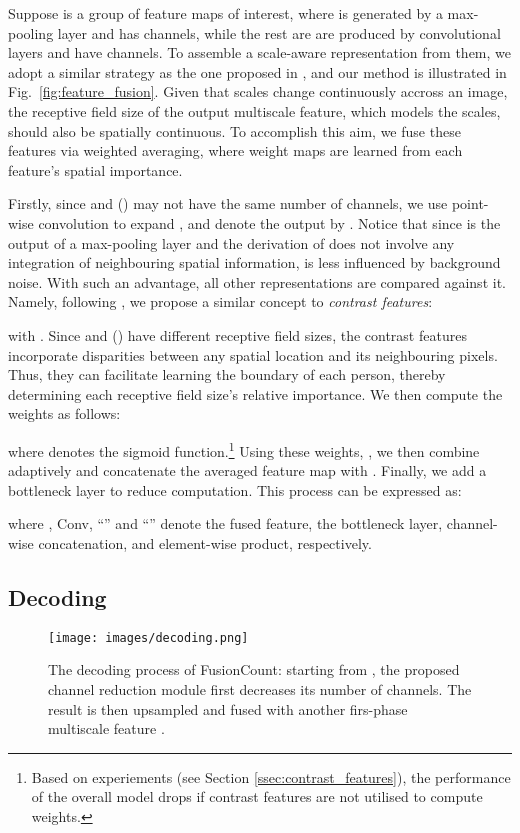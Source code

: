 \documentclass{article}
\begin{document}
Suppose  is a group of feature maps of interest, where  is generated by a max-pooling layer and has  channels, while the rest are are produced by convolutional layers and have  channels. To assemble a scale-aware representation from them, we adopt a similar strategy as the one proposed in \cite{CAN}, and our method is illustrated in Fig.~\ref{fig:feature_fusion}. Given that scales change continuously accross an image, the receptive field size of the output multiscale feature, which models the scales, should also be spatially continuous. To accomplish this aim, we fuse these features via weighted averaging, where weight maps are learned from each feature's spatial importance.

Firstly, since  and  () may not have the same number of channels, we use point-wise convolution to expand , and denote the output by . Notice that since  is the output of a max-pooling layer and the derivation of  does not involve any integration of neighbouring spatial information,  is less influenced by background noise. With such an advantage, all other representations are compared against it. Namely, following \cite{CAN}, we propose a similar concept to \emph{contrast features}:

with . Since  and  () have different receptive field sizes, the contrast features  incorporate disparities between any spatial location and its neighbouring pixels. Thus, they can facilitate learning the boundary of each person, thereby determining each receptive field size's relative importance. We then compute the weights  as follows:

where  denotes the sigmoid function.\footnote{Based on experiements (see Section \ref{ssec:contrast_features}), the performance of the overall model drops if contrast features are not utilised to compute weights.} Using these weights, ,  we then combine  adaptively and concatenate the averaged feature map with . Finally, we add a bottleneck layer to reduce computation. This process can be expressed as:

where , Conv, ``'' and ``'' denote the fused feature, the bottleneck layer, channel-wise concatenation, and element-wise product, respectively.
 
\subsection{Decoding}
\label{ssec:decoding}

\begin{figure}[t]
    \centering
    \texttt{[image: images/decoding.png]}
    \caption{The decoding process of FusionCount: starting from , the proposed channel reduction module first decreases its number of channels. The result is then upsampled and fused with another firs-phase multiscale feature .}
    \label{fig:decoder}
\end{figure}
\end{document}
